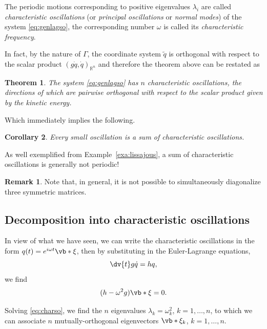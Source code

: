 \documentclass[english,fontsize=11pt,paper=b5]{scrbook}
\numberwithin{equation}{chapter}
\newtheorem{theorem}{Theorem}[chapter]
\newtheorem{corollary}[theorem]{Corollary}
\theoremstyle{definition}
\newtheorem{remark}{Remark}[chapter]
\begin{document}
    \begin{tcolorbox}
      The periodic motions corresponding to positive eigenvalues $\lambda_i$ are called \emph{characteristic oscillations} (or \emph{principal oscillations} or \emph{normal modes}) of the system \eqref{eq:genlagso}, the corresponding number $\omega$ is called its \emph{characteristic frequency}.
    \end{tcolorbox}

    In fact, by the nature of $\Gamma$, the coordinate system $\widetilde q$ is orthogonal with respect to the scalar product $(g\dot q, \dot q)_{\mathbb{R}^n}$ and therefore the theorem above can be restated as
    \begin{theorem}
      The system \eqref{eq:genlagso} has $n$ characteristic oscillations, the directions of which are pairwise orthogonal with respect to the scalar product given by the kinetic energy.
    \end{theorem}

    Which immediately implies the following.

    \begin{corollary}
      Every small oscillation is a sum of characteristic oscillations.
    \end{corollary}

    As well exemplified from Example~\ref{exa:lissajous}, a sum of characteristic oscillations is generally not periodic!

    \begin{remark}
      Note that, in general, it is not possible to simultaneously diagonalize three symmetric matrices.
    \end{remark}

    \subsection{Decomposition into characteristic oscillations}\label{eq:decomposition}

    In view of what we have seen, we can write the characteristic oscillations in the form $q(t) = e^{i\omega t} \vb*{\xi}$, then by substituting in the Euler-Lagrange equations,
    \begin{equation}
      \dv{t} g \dot q = h q,
    \end{equation}
    we find
    \begin{equation}
      (h - \omega^2 g)\vb*{\xi} = 0.
    \end{equation}

    Solving \eqref{eq:charso}, we find the $n$ eigenvalues $\lambda_k = \omega_k^2$, $k=1, \ldots, n$, to which we can associate $n$ mutually-orthogonal eigenvectors $\vb*{\xi}_k$, $k=1, \ldots, n$.
\end{document}
